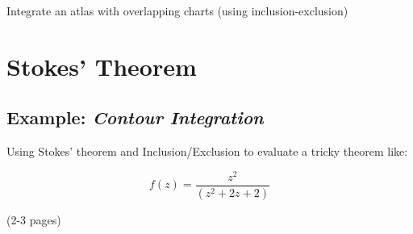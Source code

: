 \begin{example}
Integrate an atlas with overlapping charts (using inclusion-exclusion)
\end{example}



%
%
\section{Stokes' Theorem}


\subsection{Example: \emph{Contour Integration}}

Using Stokes' theorem and Inclusion/Exclusion to evaluate a tricky theorem like:

\begin{equation}
f(z) = \frac{z^2}{(z^2 + 2z + 2)}
\end{equation}


 (2-3 pages)

\newpage
